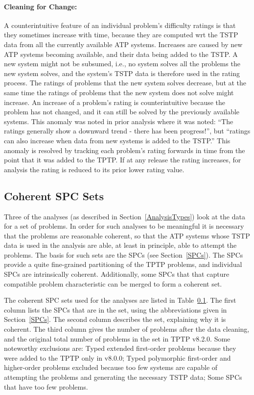 \documentclass[runningheads]{llncs}
\begin{document}
\paragraph{Cleaning for Change:}
A counterintuitive feature of an individual problem's difficulty ratings is that they sometimes 
increase with time, because they are computed wrt the TSTP data from all the currently available
ATP systems.
Increases are caused by new ATP systems becoming available, and their data being added to the TSTP.
A new system might not be subsumed, i.e., no system solves all the problems the new system solves, 
and the system's TSTP data is therefore used in the rating process.
The ratings of problems that the new system solves decrease, but at the same time the ratings of
problems that the new system does not solve might increase.
An increase of a problem's rating is counterintuitive because the problem has not changed, and 
it can still be solved by the previously available systems.
This anomaly was noted in prior analysis \cite{Sut17} where it was noted: ``The ratings generally 
show a downward trend - there has been progress!'', but ``ratings can also increase when data 
from new systems is added to the TSTP.''
This anomaly is resolved by tracking each problem's rating forwards in time from the point 
that it was added to the TPTP.
If at any release the rating increases, for analysis the rating is reduced to its prior
lower rating value.

\subsection{Coherent SPC Sets}
\label{SPCSets}

Three of the analyses (as described in Section~\ref{AnalysisTypes}) look at the data for a set
of problems.
In order for such analyses to be meaningful it is necessary that the problems are reasonable
coherent, so that the ATP systems whose TSTP data is used in the analysis are able, at least
in principle, able to attempt the problems.
The basis for such sets are the SPCs (see Section~\ref{SPCs}).
The SPCs provide a quite fine-grained partitioning of the TPTP problems, and individual SPCs
are intrinsically coherent.
Additionally, some SPCs that that capture compatible problem characteristic can be merged
to form a coherent set.

The coherent SPC sets used for the analyses are listed in Table~\ref{SPCSets}.
The first column lists the SPCs that are in the set, using the abbreviations given in 
Section~\ref{SPCs}.
The second column describes the set, explaining why it is coherent.
The third column gives the number of problems after the data cleaning, and the original
total number of problems in the set in TPTP v8.2.0.
Some noteworthy exclusions are:
Typed extended first-order problems because they were added to the TPTP only in v8.0.0;
Typed polymorphic first-order and higher-order problems excluded because too few systems are 
capable of attempting the problems and generating the necessary TSTP data;
Some SPCs that have too few problems.
\end{document}
